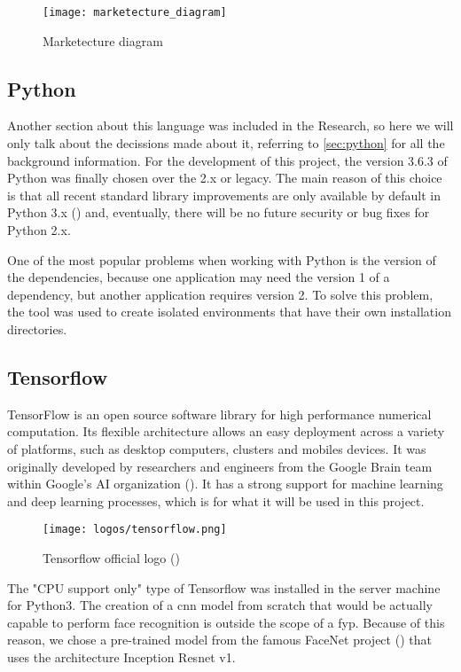 \begin{figure}[!ht]
	\centering
	\texttt{[image: marketecture\_diagram]}
	\caption{Marketecture diagram}
	\label{fig:marketecture_diagram}
\end{figure}	

	\subsection{Python}
	Another section about this language was included in the Research, so here we will only talk about the decissions made about it, referring to \ref{sec:python} for all the background information. For the development of this project, the version 3.6.3 of Python was finally chosen over the 2.x or legacy. The main reason of this choice is that all recent standard library improvements are only available by default in Python 3.x (\cite{python_2or3}) and, eventually, there will be no future security or bug fixes for Python 2.x.

	One of the most popular problems when working with Python is the version of the dependencies, because one application may need the version 1 of a dependency, but another application requires version 2. To solve this problem, the \cite{virtualenv} tool was used to create isolated environments that have their own installation directories.  

	\subsection{Tensorflow}
	TensorFlow is an open source software library for high performance numerical computation. Its flexible architecture allows an easy deployment across a variety of platforms, such as desktop computers, clusters and mobiles devices. It was originally developed by researchers and engineers from the Google Brain team within Google’s AI organization (\cite{tensorflow_main_website}). It has a strong support for machine learning and deep learning processes, which is for what it will be used in this project. 

	\begin{figure}[!ht]
		\centering
		\texttt{[image: logos/tensorflow.png]}
		\caption{Tensorflow official logo (\cite{tensorflow_main_website})}
		\label{fig:tensorflow}
	\end{figure}

	The "CPU support only" type of Tensorflow was installed in the server machine for Python3. The creation of a \gls{cnn} model from scratch that would be actually capable to perform face recognition is outside the scope of a \gls{fyp}. Because of this reason, we chose a pre-trained model from the famous FaceNet project (\cite{facenet_article}) that uses the architecture Inception Resnet v1.

